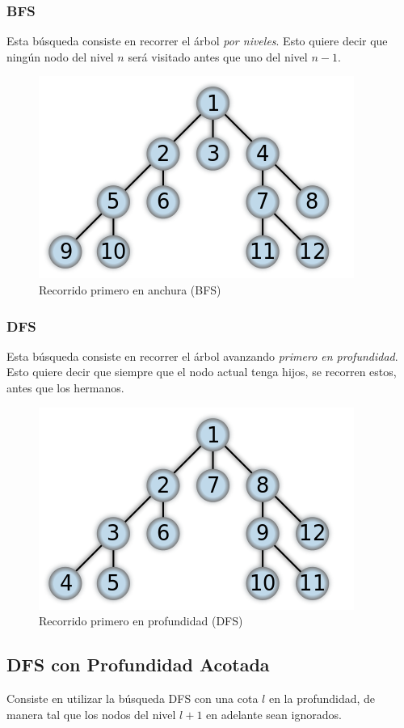 \documentclass[11pt,a4paper]{article}
\begin{document}
\subsubsection{BFS}
Esta búsqueda consiste en recorrer el árbol \emph{por niveles}. Esto quiere decir que ningún nodo del nivel $n$ será visitado antes que uno del nivel $n-1$.
{
\begin{figure}
  \centering
    \includegraphics{img/BFS}
  \caption{Recorrido primero en anchura (BFS)}
  \label{fig:BFS}
\end{figure}
}
\subsubsection{DFS}
Esta búsqueda consiste en recorrer el árbol avanzando \emph{primero en profundidad}. Esto quiere decir que siempre que el nodo actual tenga hijos, se recorren estos, antes que los hermanos.
{
\begin{figure}
  \centering
    \includegraphics{img/DFS}
  \caption{Recorrido primero en profundidad (DFS)}
  \label{fig:DFS}
\end{figure}
}
\subsection{DFS con Profundidad Acotada}
Consiste en utilizar la búsqueda DFS con una cota $l$ en la profundidad, de manera tal que los nodos del nivel $l+1$ en adelante sean ignorados. 
\end{document}

